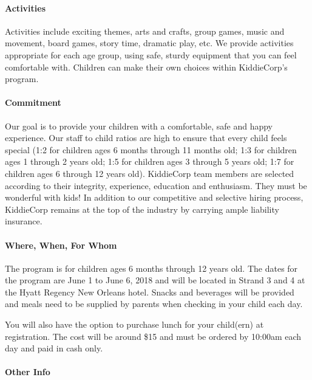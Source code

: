 \paragraph{Activities} Activities include exciting themes, arts  and  crafts, group games, music
and  movement, board games, story time, dramatic play, etc. We provide
activities appropriate for each age group, using safe, sturdy equipment that
you can feel comfortable with. Children can make their own choices within
KiddieCorp's program.


\paragraph{Commitment} Our goal is to provide your children with a comfortable, safe and happy
experience. Our staff to child ratios are high to ensure that every child
feels special (1:2 for children ages 6 months through 11 months old; 1:3 for
children ages 1 through 2 years old; 1:5 for children ages 3 through 5 years
old; 1:7 for children ages 6 through 12 years old). KiddieCorp team members
are selected according to their integrity, experience, education and
enthusiasm. They must be wonderful with kids! In addition to our competitive
and selective hiring process, KiddieCorp remains at the top of the industry
by carrying ample liability insurance.


\paragraph{Where, When, For Whom} The program is for children ages 6 months through 12 years old. The dates
for the program are June 1 to June 6, 2018  and will be located in Strand 3 and 4 at the Hyatt Regency New Orleans hotel.  Snacks and beverages
will be provided and meals need to be supplied by parents when checking in
your child each day.

You will also have the option to purchase lunch for your child(ern) at
registration. The cost will be around \$15 and must be ordered by 10:00am each day and
paid in cash only. 


\paragraph{Other Info}

